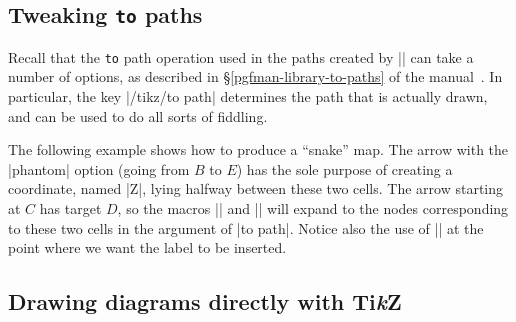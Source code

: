 \documentclass[a4paper]{ltxdoc}
\begin{document}
\subsection{Tweaking \texttt{to} paths}
\label{sec:tweaking-to-paths}

Recall that the \texttt{to} path operation used in the paths created by
|\arrow| can take a number of options, as described in 
\S\ref*{pgfman-library-to-paths} of the \pgfname{} manual~\cite{pgfman}.  In particular, the
key |/tikz/to path| determines the path that is actually drawn, and
can be used to do all sorts of fiddling.

\begin{codeexample}[]
\end{codeexample}%

The following example shows how to produce a ``snake'' map.  The arrow
with the |phantom| option (going from $B$ to $E$) has the sole purpose
of creating a coordinate, named |Z|, lying halfway between these two
cells.  The arrow starting at $C$ has target $D$, so the macros
|\tikztostart| and |\tikztotarget| will expand to the nodes
corresponding to these two cells in the argument of |to path|.  Notice
also the use of |\tikztonodes| at the point where we want the label to
be inserted.
\begin{codeexample}[]
\end{codeexample}

\subsection{Drawing diagrams directly with Ti\emph{k}Z}
\label{sec:draw-diagr-directly}
\end{document}
